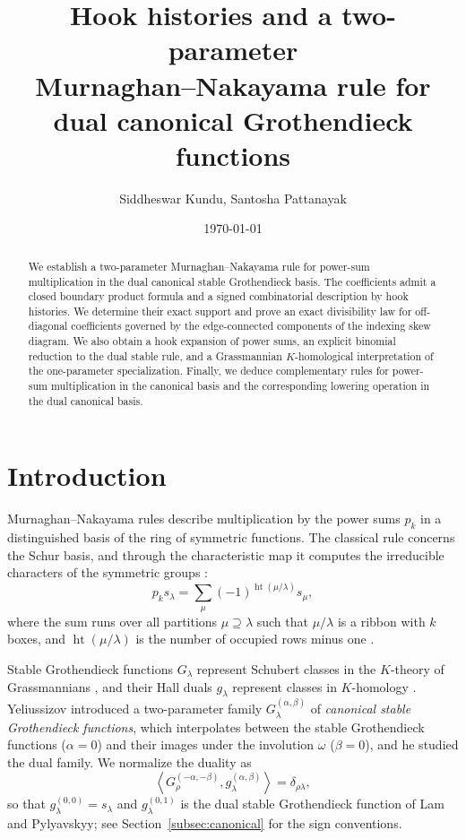 \documentclass[11pt]{amsart}
\title[Murnaghan--Nakayama rules for dual canonical Grothendieck functions]
{Hook histories and a two-parameter\\ Murnaghan--Nakayama rule for\\
dual canonical Grothendieck functions}
\author{Siddheswar Kundu, Santosha Pattanayak}
\date{\today}
\DeclareRobustCommand{\S}{\ensuremath{\mathsection}}
\numberwithin{equation}{section}
\theoremstyle{definition}
\theoremstyle{remark}
\newcommand{\hgt}{\operatorname{ht}}
\newcommand{\Hall}[2]{\left\langle #1,#2\right\rangle}
\begin{document}
\begin{abstract}
We establish a two-parameter Murnaghan--Nakayama rule for power-sum
multiplication in the dual canonical stable Grothendieck basis.
The coefficients admit a closed boundary product formula and a
signed combinatorial description by hook histories. We determine
their exact support and prove an exact divisibility law for
off-diagonal coefficients governed by the edge-connected components
of the indexing skew diagram. We also obtain a hook expansion of
power sums, an explicit binomial reduction to the dual stable rule,
and a Grassmannian $K$-homological interpretation of the one-parameter
specialization. Finally, we deduce complementary rules for power-sum
multiplication in the canonical basis and the corresponding lowering
operation in the dual canonical basis.
\end{abstract}

\maketitle

\section{Introduction}\label{sec:introduction}

Murnaghan--Nakayama rules describe multiplication by the power sums $p_k$
in a distinguished basis of the ring of symmetric functions. The classical
rule concerns the Schur basis, and through the characteristic map it
computes the irreducible characters of the symmetric groups
\cite[Ch.~I, \S7]{Macdonald}: 
\begin{equation}\label{eq:classical-MN}
 p_k s_\lambda=\sum_{\mu}(-1)^{\hgt(\mu/\lambda)}s_\mu ,
\end{equation}
where the sum runs over all partitions $\mu\supseteq\lambda$ such that
$\mu/\lambda$ is a ribbon with $k$ boxes, and $\hgt(\mu/\lambda)$ is the
number of occupied rows minus one \cite[Ch.~I, \S3, Ex.~11]{Macdonald}.

Stable Grothendieck functions $G_\lambda$ represent Schubert classes in
the $K$-theory of Grassmannians \cite{Buch}, and their Hall duals
$g_\lambda$ represent classes in $K$-homology \cite{LamPylyavskyy}.
Yeliussizov \cite{Yeliussizov} introduced a two-parameter family
$G^{(\alpha,\beta)}_\lambda$ of \emph{canonical stable Grothendieck
functions}, which interpolates between the stable Grothendieck functions
($\alpha=0$) and their images under the involution $\omega$ ($\beta=0$), and
he studied the dual family. We normalize the duality as
\begin{equation}\label{eq:duality-intro}
 \Hall{G^{(-\alpha,-\beta)}_\rho}{g^{(\alpha,\beta)}_\lambda}=\delta_{\rho\lambda},
\end{equation}
so that $g^{(0,0)}_\lambda=s_\lambda$ and $g^{(0,1)}_\lambda$ is the dual
stable Grothendieck function of Lam and Pylyavskyy; see
Section~\ref{subsec:canonical} for the sign conventions.
\end{document}
